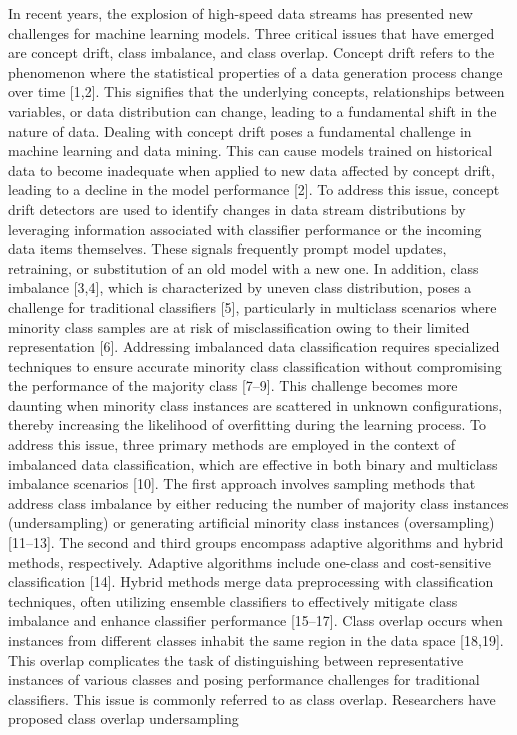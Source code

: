 In recent years, the explosion of high-speed data streams has presented new challenges for machine learning models. Three critical
issues that have emerged are concept drift, class imbalance, and class overlap. Concept drift refers to the phenomenon where the
statistical properties of a data generation process change over time [1,2]. This signifies that the underlying concepts, relationships
between variables, or data distribution can change, leading to a fundamental shift in the nature of data. Dealing with concept drift
poses a fundamental challenge in machine learning and data mining. This can cause models trained on historical data to become
inadequate when applied to new data affected by concept drift, leading to a decline in the model performance [2]. To address this issue,
concept drift detectors are used to identify changes in data stream distributions by leveraging information associated with classifier
performance or the incoming data items themselves. These signals frequently prompt model updates, retraining, or substitution of an
old model with a new one.
In addition, class imbalance [3,4], which is characterized by uneven class distribution, poses a challenge for traditional classifiers
[5], particularly in multiclass scenarios where minority class samples are at risk of misclassification owing to their limited representation [6]. Addressing imbalanced data classification requires specialized techniques to ensure accurate minority class classification without compromising the performance of the majority class [7–9]. This challenge becomes more daunting when minority class instances are scattered in unknown configurations, thereby increasing the likelihood of overfitting during the learning process. To
address this issue, three primary methods are employed in the context of imbalanced data classification, which are effective in both
binary and multiclass imbalance scenarios [10]. The first approach involves sampling methods that address class imbalance by either
reducing the number of majority class instances (undersampling) or generating artificial minority class instances (oversampling)
[11–13]. The second and third groups encompass adaptive algorithms and hybrid methods, respectively. Adaptive algorithms include
one-class and cost-sensitive classification [14]. Hybrid methods merge data preprocessing with classification techniques, often utilizing ensemble classifiers to effectively mitigate class imbalance and enhance classifier performance [15–17].
Class overlap occurs when instances from different classes inhabit the same region in the data space [18,19]. This overlap complicates the task of distinguishing between representative instances of various classes and posing performance challenges for traditional classifiers. This issue is commonly referred to as class overlap. Researchers have proposed class overlap undersampling
